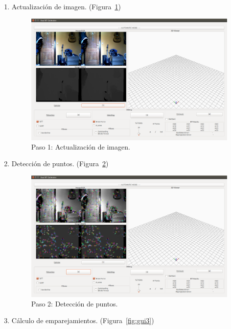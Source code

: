 \begin{enumerate}
\item Actualización de imagen. (Figura~\ref{fig:gui1})

\begin{figure}[th]
\centering
\includegraphics[scale=0.29]{Figures/gui1.png}
\decoRule
\caption[GUI: Actualización de imagen]{Paso 1: Actualización de imagen.}
\label{fig:gui1}
\end{figure}

\item Detección de puntos. (Figura~\ref{fig:gui2})

\begin{figure}[th]
\centering
\includegraphics[scale=0.29]{Figures/gui2.png}
\decoRule
\caption[GUI: Detección de puntos]{Paso 2: Detección de puntos.}
\label{fig:gui2}
\end{figure}
 
\item Cálculo de emparejamientos. (Figura~\ref{fig:gui3})


\end{enumerate}
